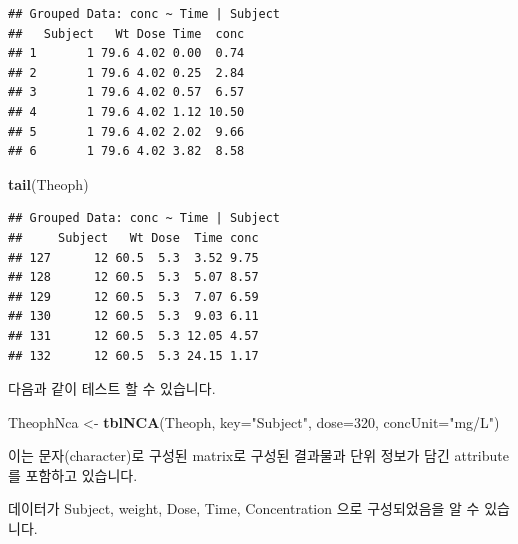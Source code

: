 \documentclass[]{krantz}
\makeatletter
\newenvironment{Shaded}{\begin{snugshade}}{\end{snugshade}}
\newcommand{\KeywordTok}[1]{\textcolor[rgb]{0.13,0.29,0.53}{\textbf{#1}}}
\newcommand{\DataTypeTok}[1]{\textcolor[rgb]{0.13,0.29,0.53}{#1}}
\newcommand{\DecValTok}[1]{\textcolor[rgb]{0.00,0.00,0.81}{#1}}
\newcommand{\StringTok}[1]{\textcolor[rgb]{0.31,0.60,0.02}{#1}}
\newcommand{\NormalTok}[1]{#1}
\newenvironment{kframe}{%
\medskip{}
\setlength{\fboxsep}{.8em}
 \def\at@end@of@kframe{}%
 \ifinner\ifhmode%
  \def\at@end@of@kframe{\end{minipage}}%
  \begin{minipage}{\columnwidth}%
 \fi\fi%
 \def\FrameCommand##1{\hskip\@totalleftmargin \hskip-\fboxsep
 \colorbox{shadecolor}{##1}\hskip-\fboxsep
     \hskip-\linewidth \hskip-\@totalleftmargin \hskip\columnwidth}%
 \MakeFramed {\advance\hsize-\width
   \@totalleftmargin\z@ \linewidth\hsize
   \@setminipage}}%
 {\par\unskip\endMakeFramed%
 \at@end@of@kframe}
\renewenvironment{Shaded}{\begin{kframe}}{\end{kframe}}
\theoremstyle{definition}
\theoremstyle{definition}
\theoremstyle{definition}
\theoremstyle{remark}
\makeatother
\begin{document}
\begin{verbatim}
## Grouped Data: conc ~ Time | Subject
##   Subject   Wt Dose Time  conc
## 1       1 79.6 4.02 0.00  0.74
## 2       1 79.6 4.02 0.25  2.84
## 3       1 79.6 4.02 0.57  6.57
## 4       1 79.6 4.02 1.12 10.50
## 5       1 79.6 4.02 2.02  9.66
## 6       1 79.6 4.02 3.82  8.58
\end{verbatim}

\begin{Shaded}
\begin{Highlighting}[]
\KeywordTok{tail}\NormalTok{(Theoph)}
\end{Highlighting}
\end{Shaded}

\begin{verbatim}
## Grouped Data: conc ~ Time | Subject
##     Subject   Wt Dose  Time conc
## 127      12 60.5  5.3  3.52 9.75
## 128      12 60.5  5.3  5.07 8.57
## 129      12 60.5  5.3  7.07 6.59
## 130      12 60.5  5.3  9.03 6.11
## 131      12 60.5  5.3 12.05 4.57
## 132      12 60.5  5.3 24.15 1.17
\end{verbatim}

다음과 같이 테스트 할 수 있습니다.

\begin{Shaded}
\begin{Highlighting}[]
\NormalTok{TheophNca <-}\StringTok{ }\KeywordTok{tblNCA}\NormalTok{(Theoph, }\DataTypeTok{key=}\StringTok{"Subject"}\NormalTok{, }\DataTypeTok{dose=}\DecValTok{320}\NormalTok{, }\DataTypeTok{concUnit=}\StringTok{"mg/L"}\NormalTok{)}
\end{Highlighting}
\end{Shaded}

이는 문자(character)로 구성된 matrix로 구성된 결과물과 단위 정보가 담긴
attribute를 포함하고 있습니다.

데이터가 Subject, weight, Dose, Time, Concentration 으로 구성되었음을 알
수 있습니다.
\end{document}

